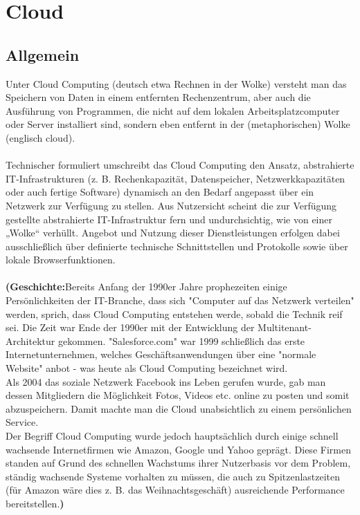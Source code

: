 \chapter{Cloud}
\section{Allgemein}
Unter Cloud Computing (deutsch etwa Rechnen in der Wolke) versteht man das Speichern von Daten in einem entfernten Rechenzentrum, aber auch die Ausführung von Programmen, die nicht auf dem lokalen Arbeitsplatzcomputer oder Server installiert sind, sondern eben entfernt in der (metaphorischen) Wolke (englisch cloud).\\\\
Technischer formuliert umschreibt das Cloud Computing den Ansatz, abstrahierte IT-Infrastrukturen (z. B. Rechenkapazität, Datenspeicher, Netzwerkkapazitäten oder auch fertige Software) dynamisch an den Bedarf angepasst über ein Netzwerk zur Verfügung zu stellen. Aus Nutzersicht scheint die zur Verfügung gestellte abstrahierte IT-Infrastruktur fern und undurchsichtig, wie von einer „Wolke“ verhüllt. Angebot und Nutzung dieser Dienstleistungen erfolgen dabei ausschließlich über definierte technische Schnittstellen und Protokolle sowie über lokale Browserfunktionen.\\\\
\textbf{(Geschichte:}Bereits Anfang der 1990er Jahre prophezeiten einige Persönlichkeiten der IT-Branche, dass sich "Computer auf das Netzwerk verteilen" werden, sprich, dass Cloud Computing entstehen werde, sobald die Technik reif sei. Die Zeit war Ende der 1990er mit der Entwicklung der Multitenant-Architektur gekommen. "Salesforce.com" war 1999 schließlich das erste Internetunternehmen, welches Geschäftsanwendungen über eine "normale Website" anbot - was heute als Cloud Computing bezeichnet wird.\\
Als 2004 das soziale Netzwerk Facebook ins Leben gerufen wurde, gab man dessen Mitgliedern die Möglichkeit Fotos, Videos etc. online zu posten und somit abzuspeichern. Damit machte man die Cloud unabsichtlich zu einem persönlichen Service.\\
Der Begriff Cloud Computing wurde jedoch hauptsächlich durch einige schnell wachsende Internetfirmen wie Amazon, Google und Yahoo geprägt. Diese Firmen standen auf Grund des schnellen Wachstums ihrer Nutzerbasis vor dem Problem, ständig wachsende Systeme vorhalten zu müssen, die auch zu Spitzenlastzeiten (für Amazon wäre dies z. B. das Weihnachtsgeschäft) ausreichende Performance bereitstellen.\textbf)

